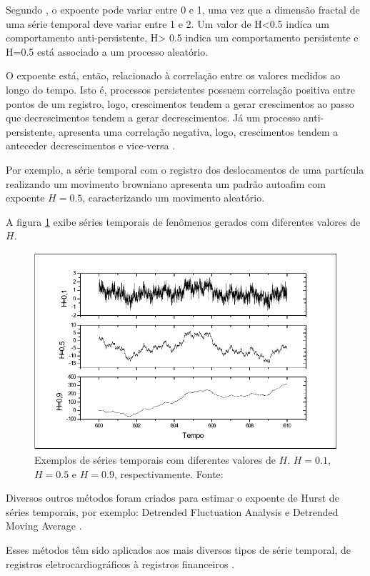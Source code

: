 \documentclass{ufscThesis}
\begin{document}
Segundo , o expoente pode variar entre 0 e 1, uma vez que a dimensão fractal de uma série temporal deve variar entre 1 e 2. Um valor de H<0.5 indica um comportamento anti-persistente, H> 0.5 indica um comportamento persistente e H=0.5 está associado a um processo aleatório. \par
O expoente está, então, relacionado à correlação entre os valores medidos ao longo do tempo. Isto é, processos persistentes possuem correlação positiva entre pontos de um registro, logo, crescimentos tendem a gerar crescimentos ao passo que decrescimentos tendem a gerar decrescimentos. Já um processo anti-persistente, apresenta uma correlação negativa, logo, crescimentos tendem a anteceder decrescimentos e vice-versa \cite{mandelbrot1983fractal}.  \par
Por exemplo, a série temporal com o registro dos deslocamentos de uma partícula realizando um movimento browniano apresenta um padrão autoafim com expoente $H=0.5$, caracterizando um movimento aleatório\cite{feder1988fractals}. \par
A figura \ref{hurstvalores} exibe séries temporais de fenômenos gerados com diferentes valores de $H$.

\begin{figure}[!h]
\centering
\includegraphics[scale=0.5]{hurstvalores.png}
\caption{Exemplos de séries temporais com diferentes valores de $H$. $H=0.1$, $H=0.5$ e $H=0.9$, respectivamente. Fonte: }
\label{hurstvalores}
\end{figure}

Diversos outros métodos foram criados para estimar o expoente de Hurst de séries temporais, por exemplo: Detrended Fluctuation Analysis \cite{Peng1994} e Detrended Moving Average \cite{Alessio2002,Carbone2004}. \par
Esses métodos têm sido aplicados aos mais diversos tipos de série temporal, de registros eletrocardiográficos \cite{Peng1995} à registros financeiros \cite{Carbone2004}.
\end{document}
